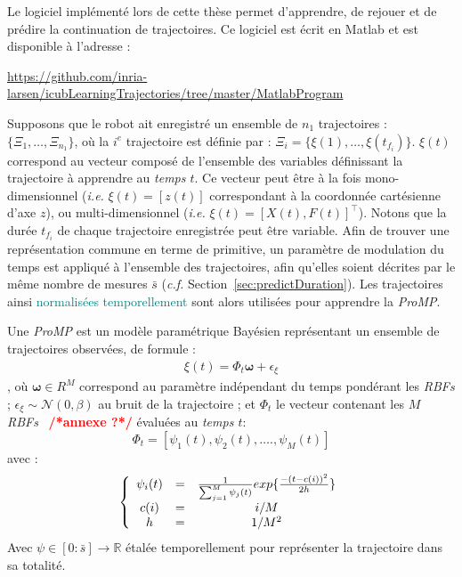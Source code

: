 \documentclass[utf8]{frontiersSCNS} %
\newcommand{\toimprove}[1]{\textcolor{teal}{#1}}
\newcommand{\todo}[1]{\textcolor{red}{\textbf{/*#1*/}}}
\begin{document}
Le logiciel implémenté lors de cette thèse permet d'apprendre, de rejouer et de prédire la continuation de trajectoires. Ce logiciel est écrit en Matlab et est disponible à l'adresse :

\url{https://github.com/inria-larsen/icubLearningTrajectories/tree/master/MatlabProgram}

Supposons que le robot ait enregistré un ensemble de $n_1$ trajectoires : $\{\Xi_1,\ldots, \Xi_{n_1} \}$, où la $i^e$ trajectoire est définie par : $\Xi_i = \{\xi(1), \ldots, \xi(t_{f_i})\}$. 
$\xi(t)$ correspond au vecteur composé de l'ensemble des variables définissant la trajectoire à apprendre au \textit{temps $t$}. Ce vecteur peut être à la fois mono-dimensionnel (\textit{i.e.} $\xi(t) = [z(t)]$  correspondant à la coordonnée cartésienne d'axe $z$), ou multi-dimensionnel (\textit{i.e.} $\xi(t) = [X(t), F(t)]^\top$). Notons que la durée $t_{f_i}$ de chaque trajectoire enregistrée peut être variable. 
Afin de trouver une représentation commune en terme de primitive, un paramètre de modulation du temps est appliqué à l'ensemble des trajectoires, afin qu'elles soient décrites par le même nombre de mesures $\bar{s}$ (\textit{c.f.}  Section~\ref{sec:predictDuration}). Les trajectoires ainsi \toimprove{normalisées temporellement} sont alors utilisées pour apprendre la \textit{ProMP}.

Une \textit{ProMP} est un modèle paramétrique Bayésien représentant un ensemble de trajectoires observées, de formule : 
\begin{eqnarray}
\xi(t) = \Phi_t \boldsymbol{\omega} + \epsilon_\xi
\end{eqnarray}
, où $\boldsymbol{\omega} \in R^M$ correspond au paramètre indépendant du temps pondérant les \textit{RBFs} ; $\epsilon_\xi \sim \mathcal{N}(0, \beta) $ au bruit de la trajectoire ; et $\Phi_t$  le vecteur contenant les $M$ \textit{RBFs}~\cite{buhmann2000radial} \todo{annexe ?} évaluées au \textit{temps $t$}:
$$ \Phi_{t}=[\psi_{1}(t), \psi_{2}(t), \ldots., \psi_{M}(t)]$$
avec :
\begin{equation} \label{eq:RBF}
\left\lbrace \begin{array}{cccc}
\psi_{i}(t) &=& {1 \over\sum_{j=1}^M \psi_{j}(t) }exp\{{-(t  - c(i))^2 \over {2h}}\} \\
c(i) &=& {i / M}\\
h &=& {1 / M^2}
\end{array} \right. 
\end{equation}
Avec $\psi \in [0: \bar{s}] \rightarrow \mathbb{R}$ étalée temporellement pour représenter la trajectoire dans sa totalité.
\end{document}
